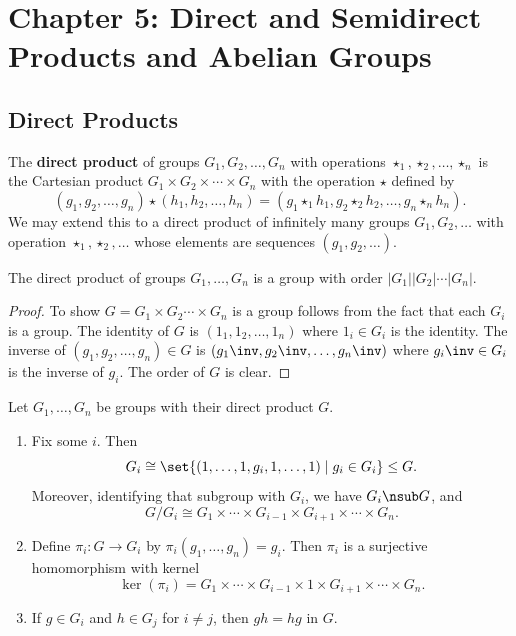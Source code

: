 \section{Chapter 5: Direct and Semidirect Products and Abelian Groups} \label{chap5}

\subsection{Direct Products} \label{sec5.1}

 The \textbf{direct product} of groups $G_1, G_2, \ldots, G_n$ with operations $\star_1, \star_2, \ldots, \star_n$ is the Cartesian product $G_1 \times G_2 \times \cdots \times G_n$ with the operation $\star$ defined by
\[(g_1, g_2, \ldots, g_n) \star (h_1, h_2, \ldots, h_n) = (g_1 \star_1 h_1, g_2 \star_2 h_2, \ldots, g_n \star_n h_n).\]
We may extend this to a direct product of infinitely many groups $G_1, G_2, \ldots$ with operation $\star_1, \star_2, \ldots$ whose elements are sequences $(g_1, g_2, \ldots)$.

 \label{prop5.1}
The direct product of groups $G_1, \ldots, G_n$ is a group with order $|G_1||G_2| \cdots |G_n|$.
\begin{proof}
    To show $G = G_1 \times G_2 \cdots \times G_n$ is a group follows from the fact that each $G_i$ is a group. The identity of $G$ is $(1_1, 1_2, \ldots, 1_n)$ where $1_i \in G_i$ is the identity. The inverse of $(g_1, g_2, \ldots, g_n) \in G$ is $(g_1\inv, g_2\inv, \ldots, g_n\inv)$ where $g_i\inv \in G_i$ is the inverse of $g_i$. The order of $G$ is clear.
\end{proof}

 \label{prop5.2}
Let $G_1, \ldots, G_n$ be groups with their direct product $G$.
\begin{enumerate}
    \item Fix some $i$. Then
    \[G_i \cong \set{(1, \ldots, 1, g_i, 1, \ldots, 1) \mid g_i \in G_i} \leq G.\]
    Moreover, identifying that subgroup with $G_i$, we have $G_i \nsub G$, and
    \[G/G_i \cong G_1 \times \cdots \times G_{i-1} \times G_{i+1} \times \cdots \times G_n.\]
    \item Define $\pi_i : G \to G_i$ by $\pi_i(g_1, \ldots, g_n) = g_i$. Then $\pi_i$ is a surjective homomorphism with kernel
    \[\ker(\pi_i) = G_1 \times \cdots \times G_{i-1} \times 1 \times G_{i+1} \times \cdots \times G_n.\]
    \item If $g \in G_i$ and $h \in G_j$ for $i \neq j$, then $gh = hg$ in $G$.
\end{enumerate}

